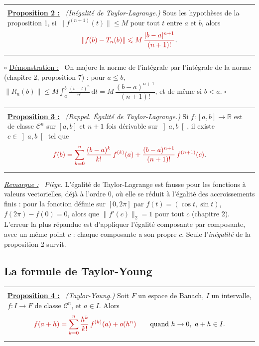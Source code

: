\documentclass[a4paper,twoside]{report}
\makeatletter
\newcommand{\rmath}[1]{\textcolor{rougecours}{#1}}
\newenvironment{cadre}%
 {\par\vspace{2mm}\noindent\begin{tabular}{|@{\hspace{4mm}}p{0.93\textwidth}@{\hspace{4mm}}|}
  \hline \\[-2mm]}%
 {\\[2mm] \hline \end{tabular}\par\vspace{3mm}}
\newcommand{\propo}[1]{\textbf{\underline{Proposition #1 :}}~}
\newenvironment{demo}%
 {\par\needspace{4\baselineskip}\vspace{1mm}\noindent$\circ$ \underline{Démonstration :}~\setlength{\parskip}{3pt plus 1pt}}%
 {\hfill$\square$\par\vspace{2mm}}
\newenvironment{remarque}%
 {\par\needspace{6\baselineskip}\vspace{1mm}\begin{list}{}{\leftmargin=1cm \rightmargin=0.5cm}\item[]%
  \textit{\underline{Remarque :}}~}%
 {\end{list}\vspace{1mm}}
\newcommand{\R}{\mathbb{R}}
\newcommand{\dd}{\mathrm{d}}                      %
\newcommand{\norme}[1]{\lVert #1 \rVert}         %
\newcommand{\Cc}{\mathcal{C}}                     %
\makeatother
\begin{document}
\begin{cadre}
\propo{2} \emph{(Inégalité de Taylor-Lagrange.)} Sous les hypothèses de la proposition 1, si $\norme{f^{(n + 1)}(t)} \leqslant M$ pour tout $t$ entre $a$ et $b$, alors
\[ \rmath{\norme{f(b) - T_{n}(b)} \leqslant M\,\frac{|b - a|^{n + 1}}{(n + 1)!}}. \]
\end{cadre}

\begin{demo}
On majore la norme de l'intégrale par l'intégrale de la norme (chapitre 2, proposition 7) : pour $a \leqslant b$, $\norme{R_{n}(b)} \leqslant M\displaystyle\int_{a}^{b} \frac{(b - t)^{n}}{n!}\,\dd t = M\,\dfrac{(b - a)^{n + 1}}{(n + 1)!}$, et de même si $b < a$.
\end{demo}

\begin{cadre}
\propo{3} \emph{(Rappel. Égalité de Taylor-Lagrange.)} Si $f : [a, b] \to \R$ est de classe $\Cc^{n}$ sur $[a, b]$ et $n + 1$ fois dérivable sur $\left]a, b\right[$, il existe $c \in \left]a, b\right[$ tel que
\[ \rmath{f(b) = \sum_{k = 0}^{n} \frac{(b - a)^{k}}{k!}\,f^{(k)}(a) + \frac{(b - a)^{n + 1}}{(n + 1)!}\,f^{(n + 1)}(c)}. \]
\end{cadre}

\begin{remarque}
\emph{Piège.} L'égalité de Taylor-Lagrange est fausse pour les fonctions à valeurs vectorielles, déjà à l'ordre $0$, où elle se réduit à l'égalité des accroissements finis : pour la fonction définie sur $[0, 2\pi]$ par $f(t) = (\cos t, \sin t)$, $f(2\pi) - f(0) = 0$, alors que $\norme{f'(c)}_{2} = 1$ pour tout $c$ (chapitre 2). L'erreur la plus répandue est d'appliquer l'égalité composante par composante, avec un même point $c$ : chaque composante a son propre $c$. Seule l'\emph{inégalité} de la proposition 2 survit.
\end{remarque}

\subsection{La formule de Taylor-Young}

\begin{cadre}
\propo{4} \emph{(Taylor-Young.)} Soit $F$ un espace de Banach, $I$ un intervalle, $f : I \to F$ de classe $\Cc^{n}$, et $a \in I$. Alors
\[ \rmath{f(a + h) = \sum_{k = 0}^{n} \frac{h^{k}}{k!}\,f^{(k)}(a) + o(h^{n})} \qquad \text{quand } h \to 0,\ a + h \in I. \]
\end{cadre}
\end{document}

